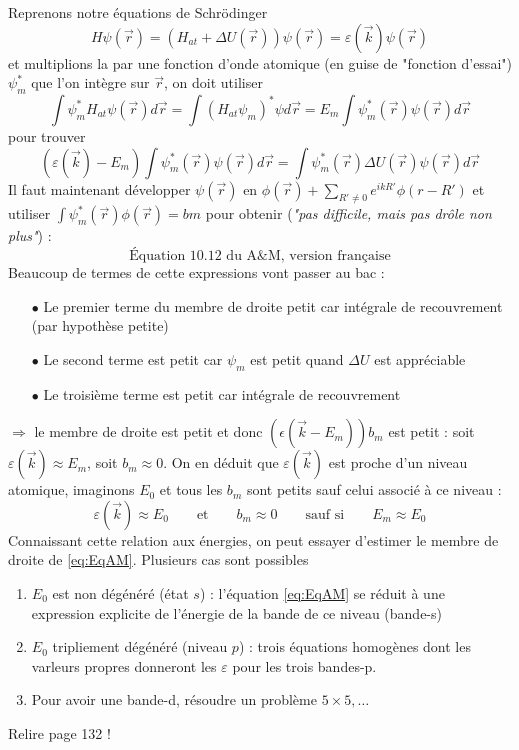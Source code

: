 Reprenons notre équations de Schrödinger
\begin{equation}
H\psi(\vec{r}) = (H_{at} + \Delta U(\vec{r}))\psi(\vec{r}) = \varepsilon(\vec{k})
\psi(\vec{r})
\end{equation}
et multiplions la par une fonction d'onde atomique (en guise de "fonction d'essai") 
$\psi_m^*$ que l'on intègre sur $\vec{r}$, on doit utiliser
\begin{equation}
\int \psi_m^* H_{at}\psi(\vec{r})d\vec{r} = \int(H_{at}\psi_m)^*\psi d\vec{r} = 
E_m\int \psi_m^*(\vec{r})\psi(\vec{r})d\vec{r}
\end{equation}
pour trouver
\begin{equation}
(\varepsilon(\vec{k})-E_m)\int \psi_m^*(\vec{r})\psi(\vec{r})d\vec{r} = \int 
\psi_m^*(\vec{r})\Delta U(\vec{r})\psi(\vec{r})d\vec{r}
\end{equation}
Il faut maintenant développer $\psi(\vec{r})$ en $\phi(\vec{r})+\sum_{R'\neq 0} 
e^{ikR'}\phi(r-R')$ et utiliser $\int \psi_m^*(\vec{r})\phi(\vec{r}) = bm$ 
pour obtenir (\textit{"pas difficile, mais pas drôle non plus"}) :
\begin{equation}
\text{Équation 10.12 du A\&M, version française}
\label{eq:EqAM}
\end{equation}
Beaucoup de termes de cette expressions vont passer au bac :
\begin{itemize}
\item[$\bullet$] Le premier terme du membre de droite petit car intégrale de 
recouvrement (par  hypothèse petite)
\item[$\bullet$] Le second terme est petit car $\psi_m$ est petit quand $\Delta U$ 
est appréciable
\item[$\bullet$] Le troisième terme est petit car intégrale de recouvrement
\end{itemize}
$\Longrightarrow$ le membre de droite est petit et donc $(\epsilon(\vec{k}-E_m))b_m$ 
est petit : soit $\varepsilon(\vec{k})\approx E_m$, soit $b_m\approx 0$.
On en déduit que $\varepsilon(\vec{k}) $ est proche d'un niveau atomique, imaginons 
$E_0$ et tous les $b_m$ sont petits sauf celui associé à ce niveau :
\begin{equation}
\varepsilon(\vec{k})\approx E_0\qquad\text{et}\qquad b_m\approx0\qquad\text{sauf si}
\qquad E_m\approx E_0
\end{equation}
Connaissant cette relation aux énergies, on peut essayer d'estimer le membre de droite 
de \autoref{eq:EqAM}. Plusieurs cas sont possibles
\begin{enumerate}
\item $E_0$ est non dégénéré (état $s$) : l'équation \autoref{eq:EqAM} se réduit à une 
expression explicite de l'énergie de la bande de ce niveau (bande-s)
\item $E_0$ tripliement dégénéré (niveau $p$) : trois équations homogènes dont les 
varleurs propres donneront les $\varepsilon$ pour les trois bandes-p.
\item Pour avoir une bande-d, résoudre un problème $5\times5,\dots$
\end{enumerate}
\danger Relire page 132 !


